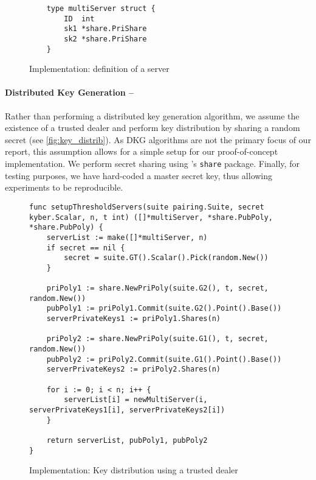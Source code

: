 	\begin{figure}[H]
		\begin{center}
			\begin{lstlisting}
	type multiServer struct {
		ID  int
		sk1 *share.PriShare
		sk2 *share.PriShare
	}
			\end{lstlisting}
			\caption{Implementation: definition of a server}
			\label{fig:server_def}
		\end{center}
  	\end{figure}
  	
  	\paragraph{Distributed Key Generation --} Rather than performing a distributed key generation algorithm, we assume the existence of a trusted dealer and perform key distribution by sharing a random secret (see \autoref{fig:key_distrib}). As DKG algorithms are not the primary focus of our report, this assumption allows for a simple setup for our proof-of-concept implementation. We perform secret sharing using \kyber's \texttt{share} package. Finally, for testing purposes, we have hard-coded a master secret key, thus allowing experiments to be reproducible. 
  	
  	\begin{figure}[H]
		\begin{center}
		\begin{lstlisting}
func setupThresholdServers(suite pairing.Suite, secret kyber.Scalar, n, t int) ([]*multiServer, *share.PubPoly, *share.PubPoly) {
	serverList := make([]*multiServer, n)
	if secret == nil {
		secret = suite.GT().Scalar().Pick(random.New())
	}

	priPoly1 := share.NewPriPoly(suite.G2(), t, secret, random.New())
	pubPoly1 := priPoly1.Commit(suite.G2().Point().Base())
	serverPrivateKeys1 := priPoly1.Shares(n)

	priPoly2 := share.NewPriPoly(suite.G1(), t, secret, random.New())
	pubPoly2 := priPoly2.Commit(suite.G1().Point().Base())
	serverPrivateKeys2 := priPoly2.Shares(n)

	for i := 0; i < n; i++ {
		serverList[i] = newMultiServer(i, serverPrivateKeys1[i], serverPrivateKeys2[i])
	}

	return serverList, pubPoly1, pubPoly2
}
		\end{lstlisting}
	\caption{Implementation: Key distribution using a trusted dealer}
		\label{fig:key_distrib}
		\end{center}
	\end{figure}


